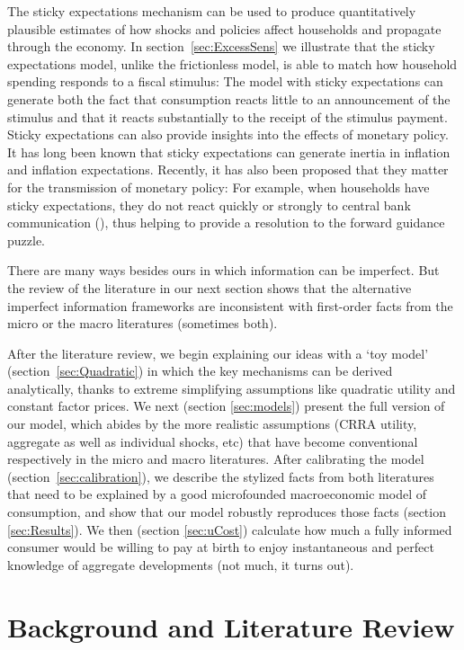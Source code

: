 \documentclass[titlepage]{article}
\begin{document}
The sticky expectations mechanism can be used to produce quantitatively plausible estimates of how shocks and policies affect households and propagate through the economy. In section~\ref{sec:ExcessSens} we illustrate that the sticky expectations model, unlike the frictionless model, is able to match how household spending responds to a fiscal stimulus: The model with sticky expectations can generate both the fact that consumption reacts little to an announcement of the stimulus and that it reacts substantially to the receipt of the stimulus payment. Sticky expectations can also provide insights into the effects of monetary policy. It has long been known that sticky expectations can generate inertia in inflation and inflation expectations. Recently, it has also been proposed that they matter for the transmission of monetary policy: For example, when households have sticky expectations, they do not react quickly or strongly to central bank communication (\cite{arsInvestmentInattention}), thus helping to provide a resolution to the forward guidance puzzle.

There are many ways besides ours in which information can be imperfect.  But the review of the literature in our next section shows that the alternative imperfect information frameworks are inconsistent with first-order facts from the micro or the macro literatures (sometimes both).

After the literature review, we begin explaining our ideas with a `toy model' (section~\ref{sec:Quadratic}) in which the key mechanisms can be derived analytically, thanks to extreme simplifying assumptions like quadratic utility and constant factor prices.  We next (section \ref{sec:models}) present the full version of our model, which abides by the more realistic assumptions (CRRA utility, aggregate as well as individual shocks, etc) that have become conventional respectively in the micro and macro literatures. After calibrating the model (section~\ref{sec:calibration}), we describe the stylized facts from both literatures that need to be explained by a good microfounded macroeconomic model of consumption, and show that our model robustly reproduces those facts (section \ref{sec:Results}).
We then (section \ref{sec:uCost}) calculate how much a fully informed consumer would be willing to pay at birth to enjoy instantaneous and perfect knowledge of aggregate developments (not much, it turns out).

\section{Background and Literature Review}\label{sec:relation}
\end{document}
